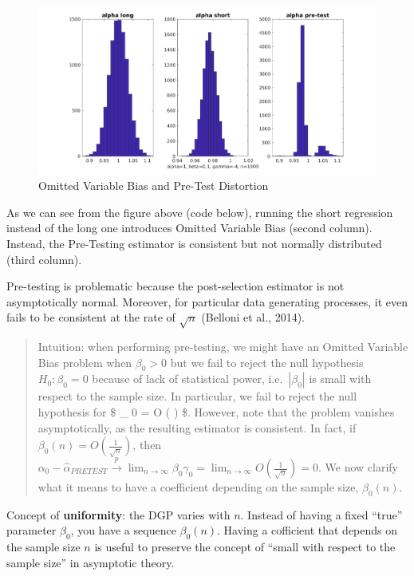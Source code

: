 \documentclass[12pt,]{book}
\begin{document}
\begin{figure}
\centering
\includegraphics{figures/Fig_621.png}
\caption{Omitted Variable Bias and Pre-Test Distortion}
\end{figure}

As we can see from the figure above (code below), running the short regression instead of the long one introduces Omitted Variable Bias (second column). Instead, the Pre-Testing estimator is consistent but not normally distributed (third column).

Pre-testing is problematic because the post-selection estimator is not asymptotically normal. Moreover, for particular data generating processes, it even fails to be consistent at the rate of \(\sqrt{n}\) (Belloni et al., 2014).

\begin{quote}
Intuition: when performing pre-testing, we might have an Omitted Variable Bias problem when \(\beta_0>0\) but we fail to reject the null hypothesis \(H_0 : \beta_0 = 0\) because of lack of statistical power, i.e.~\(|\beta_0|\) is small with respect to the sample size. In particular, we fail to reject the null hypothesis for \$ \beta \_ 0 = O \left(  \right) \$. However, note that the problem vanishes asymptotically, as the resulting estimator is consistent. In fact, if \(\beta_0(n) = O \left( \frac{1}{\sqrt{n}}\right)\), then \(\alpha_0 - \hat \alpha_{PRETEST} \overset{p}{\to} \lim_{n \to \infty} \beta_0 \gamma_0 = \lim_{n \to \infty} O \left( \frac{1}{\sqrt{n}} \right) = 0\). We now clarify what it means to have a coefficient depending on the sample size, \(\beta_0(n)\).
\end{quote}

Concept of \textbf{uniformity}: the DGP varies with \(n\). Instead of having a fixed ``true'' parameter \(\beta_0\), you have a sequence \(\beta_0(n)\).
Having a cofficient that depends on the sample size \(n\) is useful to preserve the concept of ``small with respect to the sample size'' in asymptotic theory.
\end{document}
